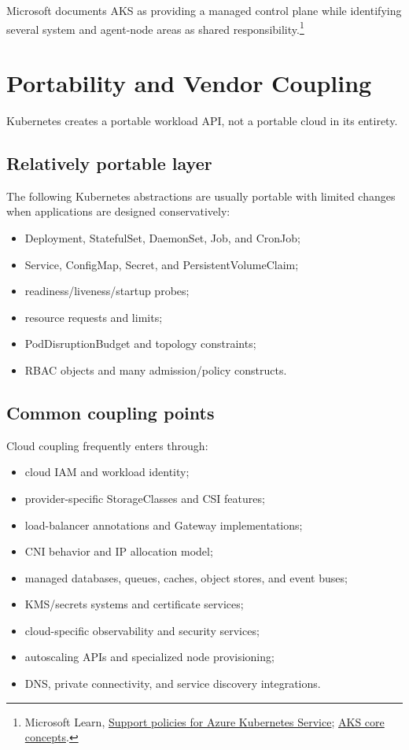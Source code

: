 \documentclass[11pt]{article}
\newcommand{\src}[2]{\href{#2}{#1}}
\begin{document}
Microsoft documents AKS as providing a managed control plane while identifying several system and agent-node areas as shared responsibility.\footnote{Microsoft Learn, \src{Support policies for Azure Kubernetes Service}{https://learn.microsoft.com/en-us/azure/aks/support-policies}; \src{AKS core concepts}{https://learn.microsoft.com/en-us/azure/aks/core-aks-concepts}.}

\section{Portability and Vendor Coupling}

Kubernetes creates a portable workload API, not a portable cloud in its entirety.

\subsection{Relatively portable layer}
The following Kubernetes abstractions are usually portable with limited changes when applications are designed conservatively:

\begin{itemize}
  \item Deployment, StatefulSet, DaemonSet, Job, and CronJob;
  \item Service, ConfigMap, Secret, and PersistentVolumeClaim;
  \item readiness/liveness/startup probes;
  \item resource requests and limits;
  \item PodDisruptionBudget and topology constraints;
  \item RBAC objects and many admission/policy constructs.
\end{itemize}

\subsection{Common coupling points}
Cloud coupling frequently enters through:

\begin{itemize}
  \item cloud IAM and workload identity;
  \item provider-specific StorageClasses and CSI features;
  \item load-balancer annotations and Gateway implementations;
  \item CNI behavior and IP allocation model;
  \item managed databases, queues, caches, object stores, and event buses;
  \item KMS/secrets systems and certificate services;
  \item cloud-specific observability and security services;
  \item autoscaling APIs and specialized node provisioning;
  \item DNS, private connectivity, and service discovery integrations.
\end{itemize}
\end{document}
